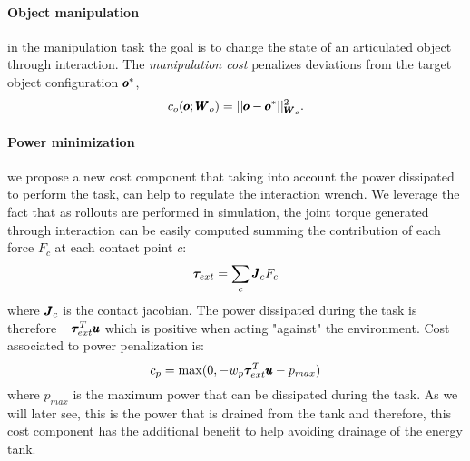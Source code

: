 \paragraph{Object manipulation} in the manipulation task the goal is to change the state of an articulated object through interaction. The \textit{manipulation cost} penalizes deviations from the target object configuration $\pmb{o}^{*}$,
\begin{equation}
    c_o(\pmb{o}; \pmb{W}_{o}) = || \pmb{o} - \pmb{o}^{*}||^2_{\pmb{W}_{o}}.
\end{equation}
\paragraph{Power minimization} we propose a new cost component that taking into account the power dissipated to perform the task, can help to regulate the interaction wrench. We leverage the fact that as rollouts are performed in simulation, the joint torque generated through interaction can be easily computed summing the contribution of each force $F_c$ at each contact point $c$:
\begin{equation}
\boldsymbol{\tau}_{ext} = \sum\limits_{c} \pmb{J}_c F_c    
\end{equation}
where $\pmb{J}_c$ is the contact jacobian. The power dissipated during the task is therefore $-\boldsymbol{\tau}_{ext}^T\pmb{u}$ which is positive when acting "against" the environment. Cost associated to power penalization is:
\begin{equation}
   c_p = \max(0, -w_{p} \boldsymbol{\tau}_{ext}^T\pmb{u} - p_{max})      
 \end{equation}
where $p_{max}$ is the maximum power that can be dissipated during the task.
As we will later see, this is the power that is drained from the tank and therefore, this cost component has the additional benefit to help avoiding drainage of the energy tank.
 
